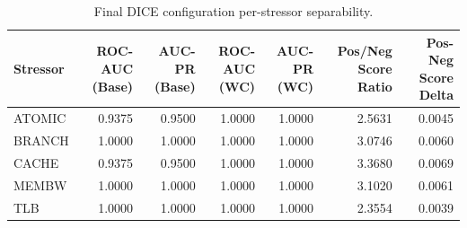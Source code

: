 \begin{table}[t]
\centering
\caption{Final DICE configuration per-stressor separability.}
\label{tab:dice_full_stressor}
\footnotesize
\begin{tabular}{lrrrrrr}
\toprule
Stressor & ROC-AUC (Base) & AUC-PR (Base) & ROC-AUC (WC) & AUC-PR (WC) & Pos/Neg Score Ratio & Pos-Neg Score Delta \\
\midrule
ATOMIC & 0.9375 & 0.9500 & 1.0000 & 1.0000 & 2.5631 & 0.0045 \\
BRANCH & 1.0000 & 1.0000 & 1.0000 & 1.0000 & 3.0746 & 0.0060 \\
CACHE & 0.9375 & 0.9500 & 1.0000 & 1.0000 & 3.3680 & 0.0069 \\
MEMBW & 1.0000 & 1.0000 & 1.0000 & 1.0000 & 3.1020 & 0.0061 \\
TLB & 1.0000 & 1.0000 & 1.0000 & 1.0000 & 2.3554 & 0.0039 \\
\bottomrule
\end{tabular}

\end{table}
